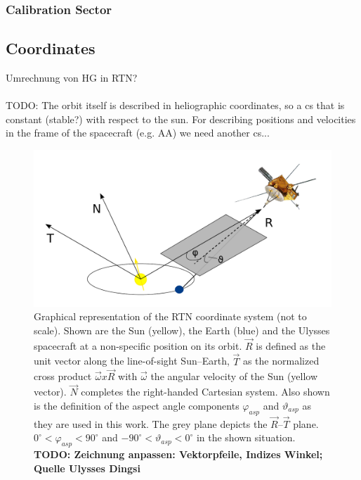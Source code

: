 \subsubsection{Calibration Sector}

\subsection{Coordinates}
Umrechnung von HG in RTN?
\\ \\
TODO:
The orbit itself is described in heliographic coordinates, so a cs that is constant (stable?) with respect to the sun. For describing positions and velocities in the frame of the spacecraft (e.g. AA) we need another cs...

\begin{figure}[h]
	\includegraphics[width=1\textwidth]{Figures/RTN_AA_angles.pdf}
	\centering
	\caption{Graphical representation of the RTN coordinate system (not to scale). Shown are the Sun (yellow), the Earth (blue) and the Ulysses spacecraft at a non-specific position on its orbit. $\vec{R}$ is defined as the unit vector along the line-of-sight Sun--Earth, $\vec{T}$ as the normalized cross product $\vec{\omega} x \vec{R}$ with $\vec{\omega}$ the angular velocity of the Sun (yellow vector). $\vec{N}$ completes the right-handed Cartesian system. Also shown is the definition of the aspect angle components $\varphi_{asp}$ and $\vartheta_{asp}$ as they are used in this work. The grey plane depicts the $\vec{R}$--$\vec{T}$ plane. $0 ^\circ < \varphi_{asp} < 90^\circ$ and $-90 ^\circ < \vartheta_{asp} < 0^\circ$ in the shown situation. \textbf{TODO: Zeichnung anpassen: Vektorpfeile, Indizes Winkel; Quelle Ulysses Dingsi}}
	\label{fig:rtn}
\end{figure}
